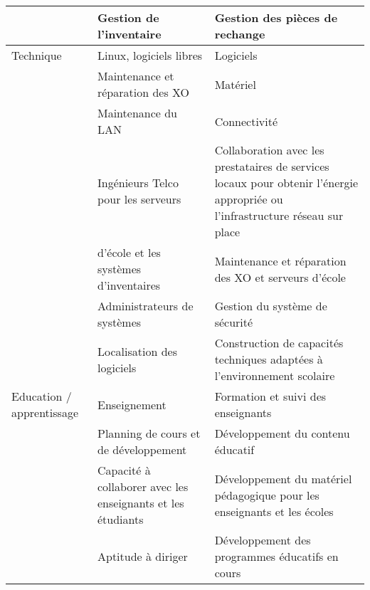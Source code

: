 \documentclass[12pt]{article}
\begin{document}
\begin{longtable}{|p{2cm}|p{5cm}|p{8cm}|}
                            &  Gestion de l’inventaire                                      &  Gestion des pièces de rechange                                                                                                  \\
\hline
 Technique                  &  Linux, logiciels libres                                      &  Logiciels                                                                                                                       \\
                            &  Maintenance et réparation des XO                             &  Matériel                                                                                                                        \\
                            &  Maintenance du LAN                                           &  Connectivité                                                                                                                    \\
                            &  Ingénieurs Telco pour les serveurs                           &  Collaboration avec les prestataires de services locaux pour obtenir l’énergie appropriée ou l'infrastructure  réseau sur place  \\
                            &  d’école et les systèmes d’inventaires                        &  Maintenance et réparation des XO et serveurs d'école                                                                            \\
                            &  Administrateurs de systèmes                                  &  Gestion du système de sécurité                                                                                                  \\
                            &  Localisation des logiciels                                   &  Construction de capacités techniques adaptées à l’environnement scolaire                                                        \\
\hline
 Education / apprentissage  &  Enseignement                                                 &  Formation et suivi des enseignants                                                                                              \\
                            &  Planning de cours et de développement                        &  Développement du contenu éducatif                                                                                               \\
                            &  Capacité à collaborer avec les enseignants et les étudiants  &  Développement du matériel pédagogique pour les enseignants et les écoles                                                        \\
                            &  Aptitude à diriger                                           &  Développement des programmes éducatifs en cours                                                                                 \\
\hline
\end{longtable}
\end{document}
